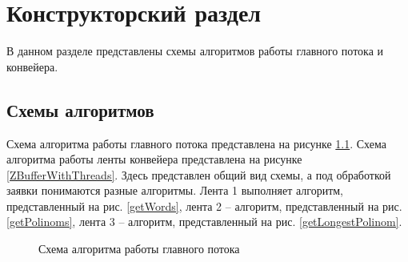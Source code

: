 \chapter{Конструкторский раздел}
В данном разделе представлены схемы алгоритмов работы главного потока и конвейера.

\section{Схемы алгоритмов}
Схема алгоритма работы главного потока представлена  на рисунке \ref{ZBufferAlg}.
Схема алгоритма работы ленты конвейера представлена  на рисунке \ref{ZBufferWithThreads}. Здесь представлен общий вид схемы, а под обработкой заявки понимаются разные алгоритмы. Лента 1 выполняет алгоритм, представленный на рис. \ref{getWords}, лента 2 -- алгоритм, представленный на рис. \ref{getPolinoms}, лента 3 -- алгоритм, представленный на рис. \ref{getLongestPolinom}.  

\begin{figure}
	\caption{Схема алгоритма работы главного потока}
	\label{ZBufferAlg}
\end{figure}

